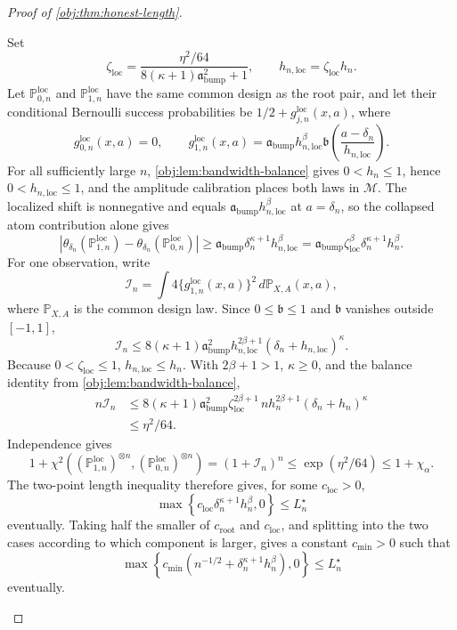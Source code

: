 \documentclass[11pt]{article}
\begin{document}
\begin{proof}[Proof of \cref{obj:thm:honest-length}]
\begin{enumerate}
Set
\[
\zeta_{\mathrm{loc}}
=
\frac{\eta^2/64}{8(\kappa+1)\mathfrak a_{\mathrm{bump}}^2+1},
\qquad
h_{n,\mathrm{loc}}=\zeta_{\mathrm{loc}}h_n .
\]
Let \(\mathbb P^{\mathrm{loc}}_{0,n}\) and \(\mathbb P^{\mathrm{loc}}_{1,n}\) have the same common design as the root pair, and let their conditional Bernoulli success probabilities be \(1/2+g^{\mathrm{loc}}_{j,n}(x,a)\), where
\[
g^{\mathrm{loc}}_{0,n}(x,a)=0,\qquad
g^{\mathrm{loc}}_{1,n}(x,a)
=\mathfrak a_{\mathrm{bump}}h_{n,\mathrm{loc}}^\beta
\mathfrak b\!\left(\frac{a-\delta_n}{h_{n,\mathrm{loc}}}\right).
\]
For all sufficiently large \(n\), \cref{obj:lem:bandwidth-balance} gives \(0<h_n\le1\), hence \(0<h_{n,\mathrm{loc}}\le1\), and the amplitude calibration places both laws in \(\mathcal M\). The localized shift is nonnegative and equals \(\mathfrak a_{\mathrm{bump}}h_{n,\mathrm{loc}}^\beta\) at \(a=\delta_n\), so the collapsed atom contribution alone gives
\[
\left|
\theta_{\delta_n}(\mathbb P^{\mathrm{loc}}_{1,n})
-\theta_{\delta_n}(\mathbb P^{\mathrm{loc}}_{0,n})
\right|
\geq
\mathfrak a_{\mathrm{bump}}\delta_n^{\kappa+1}h_{n,\mathrm{loc}}^\beta
=
\mathfrak a_{\mathrm{bump}}\zeta_{\mathrm{loc}}^\beta
\delta_n^{\kappa+1}h_n^\beta .
\]
For one observation, write
\[
\mathcal I_n
=
\int 4\{g^{\mathrm{loc}}_{1,n}(x,a)\}^2\,d\mathbb P_{X,A}(x,a),
\]
where \(\mathbb P_{X,A}\) is the common design law. Since \(0\leq\mathfrak b\leq1\) and \(\mathfrak b\) vanishes outside \([-1,1]\),
\[
\mathcal I_n
\le
8(\kappa+1)\mathfrak a_{\mathrm{bump}}^2
h_{n,\mathrm{loc}}^{2\beta+1}(\delta_n+h_{n,\mathrm{loc}})^\kappa .
\]
Because \(0<\zeta_{\mathrm{loc}}\leq1\), \(h_{n,\mathrm{loc}}\leq h_n\). With \(2\beta+1>1\), \(\kappa\geq0\), and the balance identity from \cref{obj:lem:bandwidth-balance},
\[
\begin{aligned}
n\mathcal I_n
&\le
8(\kappa+1)\mathfrak a_{\mathrm{bump}}^2
\zeta_{\mathrm{loc}}^{2\beta+1}
\,n h_n^{2\beta+1}(\delta_n+h_n)^\kappa \\
&\le
\eta^2/64 .
\end{aligned}
\]
Independence gives
\[
1+\chi^2\!\left((\mathbb P^{\mathrm{loc}}_{1,n})^{\otimes n},
(\mathbb P^{\mathrm{loc}}_{0,n})^{\otimes n}\right)
=(1+\mathcal I_n)^n
\le \exp(\eta^2/64)
\le 1+\chi_\alpha .
\]
The two-point length inequality therefore gives, for some \(c_{\mathrm{loc}}>0\),
\[
\max\!\left\{c_{\mathrm{loc}}\delta_n^{\kappa+1}h_n^\beta,0\right\}
\le L_n^\star
\]
eventually. Taking half the smaller of \(c_{\mathrm{root}}\) and \(c_{\mathrm{loc}}\), and splitting into
the two cases according to which component is larger, gives a constant \(c_{\mathrm{min}}>0\) such that
\[
\max\!\left\{c_{\mathrm{min}}\left(n^{-1/2}+\delta_n^{\kappa+1}h_n^\beta\right),0\right\}
\le L_n^\star
\]
eventually.


\end{enumerate}
\end{proof}
\end{document}
